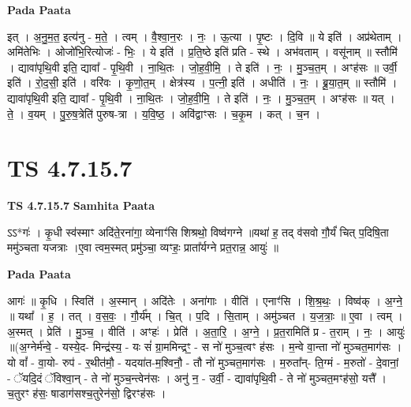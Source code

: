 \documentclass[17pt]{extarticle}
\begin{document}
\textbf{Pada Paata} \newline

इत् । अ॒नु॒म॒त॒ इत्य॑नु - म॒ते॒ । त्वम् । वै॒श्वा॒न॒रः । नः॒ । ऊ॒त्या । पृ॒ष्टः । दि॒वि ॥ ये इति॑ । अप्र॑थेताम् । अमि॑तेभिः । ओजो॑भि॒रित्योजः॑ - भिः॒ । ये इति॑ । प्र॒ति॒ष्ठे इति॑ प्रति - स्थे । अभ॑वताम् । वसू॑नाम् ॥ स्तौमि॑ । द्यावा॑पृथि॒वी इति॒ द्यावा᳚ - पृ॒थि॒वी । ना॒थि॒तः । जो॒ह॒वी॒मि॒ । ते इति॑ । नः॒ । मु॒ञ्च॒त॒म् । अꣳह॑सः ॥ उर्वी॒ इति॑ । रो॒द॒सी॒ इति॑ । वरि॑वः । कृ॒णो॒त॒म् । क्षेत्र॑स्य । प॒त्नी॒ इति॑ । अधीति॑ । नः॒ । ब्रू॒या॒त॒म् ॥ स्तौमि॑ । द्यावा॑पृथि॒वी इति॒ द्यावा᳚ - पृ॒थि॒वी । ना॒थि॒तः । जो॒ह॒वी॒मि॒ । ते इति॑ । नः॒ । मु॒ञ्च॒त॒म् । अꣳह॑सः ॥ यत् । ते॒ । व॒यम् । पु॒रु॒ष॒त्रेति॑ पुरुष-त्रा । य॒वि॒ष्ठ॒ । अवि॑द्वाꣳसः । च॒कृ॒म । कत् । च॒न ।  \newline




\section*{ TS 4.7.15.7 }

\textbf{TS 4.7.15.7 } \newline
\textbf{Samhita Paata} \newline

ऽऽ*गः॑ । कृ॒धी स्व॑स्माꣳ अदि॑ते॒रना॑गा॒ व्येनाꣳ॑सि शिश्रथो॒ विष्व॑गग्ने ॥यथा॑ ह॒ तद् व॑सवो गौ॒र्यं॑ चित् प॒दिषि॒ता ममु॑ञ्चता यजत्राः ।ए॒वा त्वम॒स्मत् प्रमु॑ञ्चा॒ व्यꣳहः॒ प्राता᳚र्यग्ने प्रत॒रान्न॒ आयुः॑ ॥ \newline

\textbf{Pada Paata} \newline

आगः॑ ॥ कृ॒धि । स्विति॑ । अ॒स्मान् । अदि॑तेः । अना॑गाः । वीति॑ । एनाꣳ॑सि । शि॒श्र॒थः॒ । विष्व॑क् । अ॒ग्ने॒ ॥ यथा᳚ । ह॒ । तत् । व॒स॒वः॒ । गौ॒र्य᳚म् । चि॒त् । प॒दि । सि॒ताम् । अमु॑ञ्चत । य॒ज॒त्राः॒ ॥ ए॒वा । त्वम् । अ॒स्मत् । प्रेति॑ । मु॒ञ्च॒ । वीति॑ । अꣳहः॑ । प्रेति॑ । अ॒ता॒रि॒ । अ॒ग्ने॒ । प्र॒त॒रामिति॑ प्र - त॒राम् । नः॒ । आयुः॑ ॥(अ॒ग्नेर्म॑न्वे॒ - यस्ये॒द- मिन्द्र॑स्य॒ - यः सं॑ ग्रा॒ममिन्द्रꣳ॒॒ - स नो॑ मुञ्च॒त्वꣳ ह॑सः । म॒न्वे वा॒न्ता नो॑ मुञ्चत॒माग॑सः । यो वां᳚ - वा॒यो- रुप॑ - र॒थीत॑मौ॒ - यदया॑त-म॒श्विनौ॒ - तौ नो॑ मुञ्चत॒माग॑सः । म॒रुता᳚न्- ति॒ग्मं - म॒रुतो॑ - दे॒वानां॒ - ॅयदि॒दं ॅविश्वा॒न् - ते नो॑ मुञ्च॒न्त्वेन॑सः । अनु॑ न॒ - उर्वी॒ - द्यावा॑पृथि॒वी - ते नो॑ मुञ्चत॒मꣳह॑सो॒ यत्तै᳚ । च॒तुरꣳ ह॑सः॒ षाडाग॑सश्च॒तुरेन॑सो॒ द्विरꣳह॑सः ।  \newline
\end{document}
